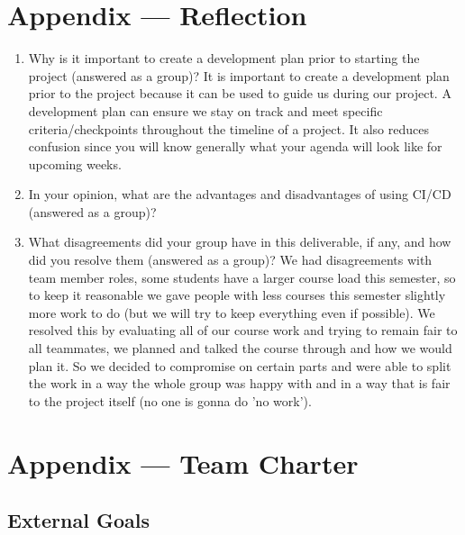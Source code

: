 \documentclass{article}
\begin{document}
\newpage{}

\section*{Appendix --- Reflection}



\begin{enumerate}
    \item Why is it important to create a development plan prior to starting the
    project (answered as a group)?
        It is important to create a development plan prior to the project 
    because it can be used to guide us during our project. A development plan can ensure
    we stay on track and meet specific criteria/checkpoints throughout the timeline 
    of a project. It also reduces confusion since you will know generally what your agenda 
    will look like for upcoming weeks. 
    \item In your opinion, what are the advantages and disadvantages of using
    CI/CD (answered as a group)?
    \item What disagreements did your group have in this deliverable, if any,
    and how did you resolve them (answered as a group)?
    We had disagreements with team member roles, some students have a larger
    course load this semester, so to keep it reasonable we gave people with less courses this 
    semester slightly more work to do (but we will try to keep everything even if possible). We resolved 
    this by evaluating all of our course work and trying to remain fair to all teammates, we planned and talked 
    the course through and how we would plan it. So we decided to compromise on certain parts and were able to split
    the work in a way the whole group was happy with and in a way that is fair to the project itself (no one is gonna do 'no work').
\end{enumerate}

\newpage{}

\section*{Appendix --- Team Charter}


\subsection*{External Goals}
\end{document}
